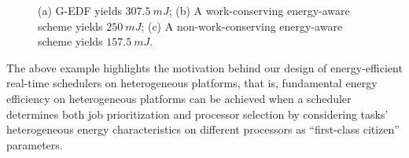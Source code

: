  
 \begin{figure}
\centering
{}
\vspace{-2mm}
\caption{\small (a) G-EDF yields $307.5~mJ$; (b) A work-conserving energy-aware scheme yields $250~mJ$; (c) A non-work-conserving energy-aware scheme yields $157.5~mJ$.}\normalsize
\vspace{-2mm}
\end{figure}

The above example highlights the motivation behind our design of energy-efficient real-time schedulers on heterogeneous platforms, that is, fundamental energy efficiency on heterogeneous platforms can be achieved when a scheduler determines both job prioritization and processor selection by considering tasks' heterogeneous energy characteristics on different processors as ``first-class citizen'' parameters.

